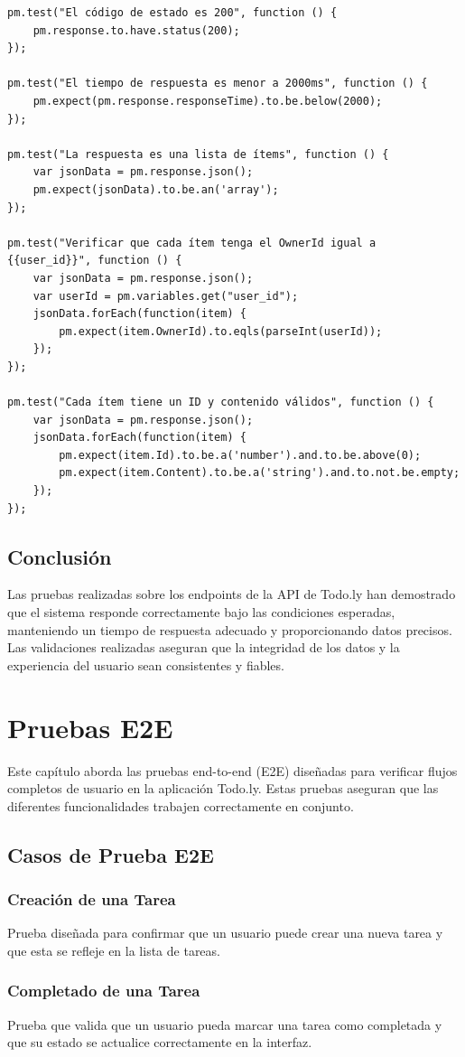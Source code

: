 \documentclass{report}
\begin{document}
\begin{lstlisting}
pm.test("El código de estado es 200", function () {
    pm.response.to.have.status(200);
});

pm.test("El tiempo de respuesta es menor a 2000ms", function () {
    pm.expect(pm.response.responseTime).to.be.below(2000);
});

pm.test("La respuesta es una lista de ítems", function () {
    var jsonData = pm.response.json();
    pm.expect(jsonData).to.be.an('array');
});

pm.test("Verificar que cada ítem tenga el OwnerId igual a {{user_id}}", function () {
    var jsonData = pm.response.json();
    var userId = pm.variables.get("user_id");
    jsonData.forEach(function(item) {
        pm.expect(item.OwnerId).to.eqls(parseInt(userId));
    });
});

pm.test("Cada ítem tiene un ID y contenido válidos", function () {
    var jsonData = pm.response.json();
    jsonData.forEach(function(item) {
        pm.expect(item.Id).to.be.a('number').and.to.be.above(0);
        pm.expect(item.Content).to.be.a('string').and.to.not.be.empty;
    });
});
\end{lstlisting}

\section{Conclusión}
Las pruebas realizadas sobre los endpoints de la API de Todo.ly han demostrado que el sistema responde correctamente bajo las condiciones esperadas, manteniendo un tiempo de respuesta adecuado y proporcionando datos precisos. Las validaciones realizadas aseguran que la integridad de los datos y la experiencia del usuario sean consistentes y fiables.


\chapter{Pruebas E2E}
Este capítulo aborda las pruebas end-to-end (E2E) diseñadas para verificar flujos completos de usuario en la aplicación Todo.ly. Estas pruebas aseguran que las diferentes funcionalidades trabajen correctamente en conjunto.

\section{Casos de Prueba E2E}
\subsection{Creación de una Tarea}
Prueba diseñada para confirmar que un usuario puede crear una nueva tarea y que esta se refleje en la lista de tareas.

\subsection{Completado de una Tarea}
Prueba que valida que un usuario pueda marcar una tarea como completada y que su estado se actualice correctamente en la interfaz.
\end{document}
